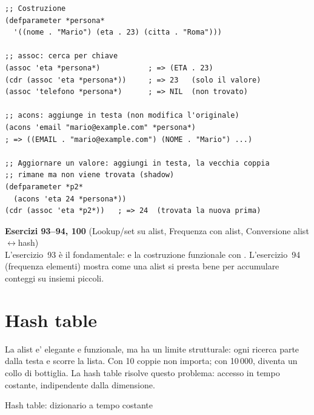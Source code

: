 \begin{esempio}
\begin{lstlisting}
;; Costruzione
(defparameter *persona*
  '((nome . "Mario") (eta . 23) (citta . "Roma")))

;; assoc: cerca per chiave
(assoc 'eta *persona*)           ; => (ETA . 23)
(cdr (assoc 'eta *persona*))     ; => 23   (solo il valore)
(assoc 'telefono *persona*)      ; => NIL  (non trovato)

;; acons: aggiunge in testa (non modifica l'originale)
(acons 'email "mario@example.com" *persona*)
; => ((EMAIL . "mario@example.com") (NOME . "Mario") ...)

;; Aggiornare un valore: aggiungi in testa, la vecchia coppia
;; rimane ma non viene trovata (shadow)
(defparameter *p2*
  (acons 'eta 24 *persona*))
(cdr (assoc 'eta *p2*))   ; => 24  (trovata la nuova prima)
\end{lstlisting}
\end{esempio}

\begin{workbook}
\textbf{Esercizi 93--94, 100}
(Lookup/set su alist, Frequenza con alist, Conversione alist$\leftrightarrow$hash)\\[4pt]
L'esercizio~93 è il fondamentale:  e la costruzione
funzionale con .
L'esercizio~94 (frequenza elementi) mostra come una alist si presta
bene per accumulare conteggi su insiemi piccoli.
\end{workbook}

\section{Hash table}

La alist e' elegante e funzionale, ma ha un limite strutturale:
ogni ricerca parte dalla testa e scorre la lista. Con 10 coppie
non importa; con 10\,000, diventa un collo di bottiglia.
La hash table risolve questo problema: accesso in tempo costante,
indipendente dalla dimensione.


\begin{concetto}{Hash table: dizionario a tempo costante}
\end{concetto}

